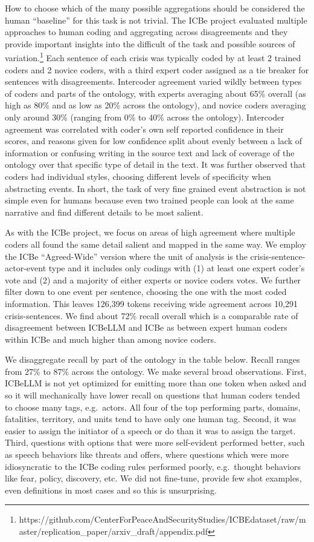 \documentclass[
]{article}
\begin{document}
How to choose which of the many possible aggregations should be
considered the human ``baseline'' for this task is not trivial. The ICBe
project evaluated multiple approaches to human coding and aggregating
across disagreements and they provide important insights into the
difficult of the task and possible sources of variation.\footnote{https://github.com/CenterForPeaceAndSecurityStudies/ICBEdataset/raw/master/replication\_paper/arxiv\_draft/appendix.pdf}
Each sentence of each crisis was typically coded by at least 2 trained
coders and 2 novice coders, with a third expert coder assigned as a tie
breaker for sentences with disagreements. Intercoder agreement varied
wildly between types of coders and parts of the ontology, with experts
averaging about 65\% overall (as high as 80\% and as low as 20\% across
the ontology), and novice coders averaging only around 30\% (ranging
from 0\% to 40\% across the ontology). Intercoder agreement was
correlated with coder's own self reported confidence in their scores,
and reasons given for low confidence split about evenly between a lack
of information or confusing writing in the source text and lack of
coverage of the ontology over that specific type of detail in the text.
It was further observed that coders had individual styles, choosing
different levels of specificity when abstracting events. In short, the
task of very fine grained event abstraction is not simple even for
humans because even two trained people can look at the same narrative
and find different details to be most salient.

As with the ICBe project, we focus on areas of high agreement where
multiple coders all found the same detail salient and mapped in the same
way. We employ the ICBe ``Agreed-Wide'' version where the unit of
analysis is the crisis-sentence-actor-event type and it includes only
codings with (1) at least one expert coder's vote and (2) and a majority
of either experts or novice coders votes. We further filter down to one
event per sentence, choosing the one with the most coded information.
This leaves 126,399 tokens receiving wide agreement across 10,291
crisis-sentences. We find about 72\% recall overall which is a
comparable rate of disagreement between ICBeLLM and ICBe as between
expert human coders within ICBe and much higher than among novice
coders.

We disaggregate recall by part of the ontology in the table below.
Recall ranges from 27\% to 87\% across the ontology. We make several
broad observations. First, ICBeLLM is not yet optimized for emitting
more than one token when asked and so it will mechanically have lower
recall on questions that human coders tended to choose many tags,
e.g.~actors. All four of the top performing parts, domains, fatalities,
territory, and units tend to have only one human tag. Second, it was
easier to assign the initiator of a speech or do than it was to assign
the target. Third, questions with options that were more self-evident
performed better, such as speech behaviors like threats and offers,
where questions which were more idiosyncratic to the ICBe coding rules
performed poorly, e.g.~thought behaviors like fear, policy, discovery,
etc. We did not fine-tune, provide few shot examples, even definitions
in most cases and so this is unsurprising.
\end{document}
